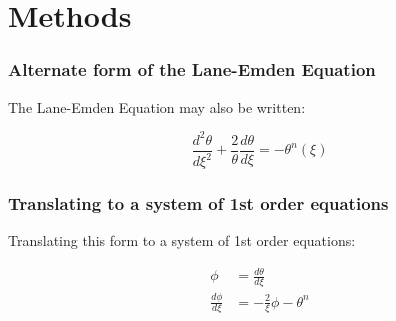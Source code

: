 \documentclass{beamer}
\begin{document}
    \section{Methods}

        \begin{frame}
            \frametitle{Alternate form of the Lane-Emden Equation}

            The Lane-Emden Equation may also be written:

            \[\frac{d^2\theta}{d\xi^2}+\frac{2}{\theta}\frac{d\theta}{d\xi}=-\theta^n(\xi)\]

        \end{frame}

        \begin{frame}
            \frametitle{Translating to a system of 1st order equations}

            Translating this form to a system of 1st order equations:

            \begin{align*}
                \phi &= \frac{d\theta}{d\xi} \\
                \frac{d\phi}{d\xi} &= -\frac{2}{\xi}\phi - \theta^n
            \end{align*}

        \end{frame}
\end{document}
